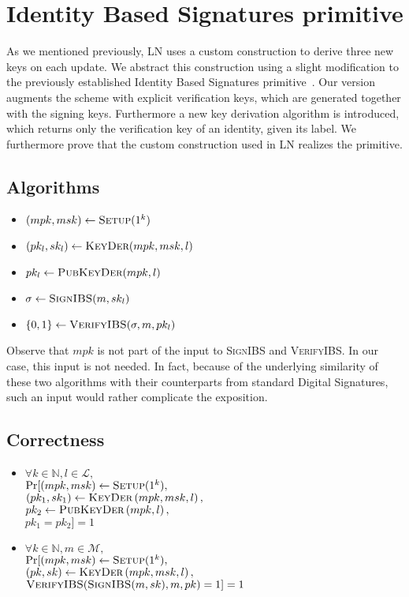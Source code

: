 \section{Identity Based Signatures primitive}
  As we mentioned previously, LN uses a custom construction to derive three new
  keys on each update. We abstract this construction using a slight modification
  to the previously established Identity Based Signatures
  primitive~\cite{ibspaterson,ibsshamir}. Our version augments the scheme with
  explicit verification keys, which are generated together with the signing
  keys. Furthermore a new key derivation algorithm is introduced, which returns
  only the verification key of an identity, given its label. We furthermore
  prove that the custom construction used in LN realizes the primitive.

  \subsection{Algorithms}
    \begin{itemize}
      \item $(mpk, msk) \leftarrow \textsc{Setup}(1^k)$
      \item $(pk_l, sk_l) \leftarrow \textsc{KeyDer}(mpk, msk, l)$
      \item $pk_l \leftarrow \textsc{PubKeyDer}(mpk, l)$
      \item $\sigma \leftarrow \textsc{SignIBS}(m, sk_l)$
      \item $\{0, 1\} \leftarrow \textsc{VerifyIBS}(\sigma, m, pk_l)$
    \end{itemize}
    Observe that $mpk$ is not part of the input to \textsc{SignIBS} and
    \textsc{VerifyIBS}. In our case, this input is not needed. In fact, because
    of the underlying similarity of these two algorithms with their
    counterparts from standard Digital Signatures, such an input would rather
    complicate the exposition.

  \subsection{Correctness}
    \begin{itemize}
      \item $\forall k \in \mathbb{N}, l \in \mathcal{L},$ \\
      $\Pr[(mpk, msk) \gets \textsc{Setup}(1^k),$ \\
      $(pk_1, sk_1) \gets \textsc{KeyDer}\left(mpk, msk, l\right),$ \\
      $pk_2 \gets \textsc{PubKeyDer}\left(mpk, l\right),$ \\
      $pk_1 = pk_2] = 1$

      \item $\forall k \in \mathbb{N}, m \in \mathcal{M},$ \\
      $\Pr[(mpk, msk) \gets \textsc{Setup}(1^k),$ \\
      $(pk, sk) \gets \textsc{KeyDer}\left(mpk, msk, l\right),$ \\
      $\textsc{VerifyIBS}(\textsc{SignIBS}(m, sk), m, pk) = 1] = 1$
    \end{itemize}

